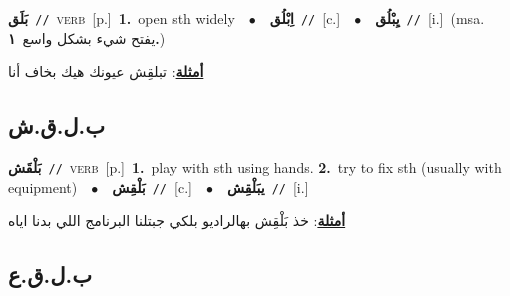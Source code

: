 \documentclass[10pt,a4paper,twoside]{article} %
\begin{document}
\begin{multicols}{2}
{\setlength\topsep{0pt}\textbf{\foreignlanguage{arabic}{بَلَق}}\ {\color{gray}\texttt{//}\color{black}}\ \textsc{verb}\ [p.]\ \textbf{1.}~open sth widely\ \ $\bullet$\ \ \setlength\topsep{0pt}\textbf{\foreignlanguage{arabic}{اِبْلُق}}\ {\color{gray}\texttt{//}\color{black}}\ [c.]\ \ $\bullet$\ \ \setlength\topsep{0pt}\textbf{\foreignlanguage{arabic}{يِبْلُق}}\ {\color{gray}\texttt{//}\color{black}}\ [i.]\ \color{gray}(msa. \foreignlanguage{arabic}{يفتح شيء بشكل واسع}~\foreignlanguage{arabic}{\textbf{١.}})\color{black}\  \begin{flushright}\color{gray}\foreignlanguage{arabic}{\textbf{\underline{\foreignlanguage{arabic}{أمثلة}}}: تبلقِش عيونك هيك بخاف أنا}\end{flushright}\color{black}} \vspace{2mm}

\vspace{-3mm}
\subsection*{\color{blue}\foreignlanguage{arabic}{ب.ل.ق.ش}\color{blue}{}} 

{\setlength\topsep{0pt}\textbf{\foreignlanguage{arabic}{بَلْقَش}}\ {\color{gray}\texttt{//}\color{black}}\ \textsc{verb}\ [p.]\ \textbf{1.}~play with sth using hands.  \textbf{2.}~try to fix sth (usually with equipment)\ \ $\bullet$\ \ \setlength\topsep{0pt}\textbf{\foreignlanguage{arabic}{بَلْقِش}}\ {\color{gray}\texttt{//}\color{black}}\ [c.]\ \ $\bullet$\ \ \setlength\topsep{0pt}\textbf{\foreignlanguage{arabic}{يبَلْقِش}}\ {\color{gray}\texttt{//}\color{black}}\ [i.]\  \begin{flushright}\color{gray}\foreignlanguage{arabic}{\textbf{\underline{\foreignlanguage{arabic}{أمثلة}}}: خذ بَلْقِش بهالراديو بلكي جبتلنا البرنامج اللي بدنا اياه}\end{flushright}\color{black}} \vspace{2mm}

\vspace{-3mm}
\subsection*{\color{blue}\foreignlanguage{arabic}{ب.ل.ق.ع}\color{blue}{}} 


\end{multicols}
\end{document}
